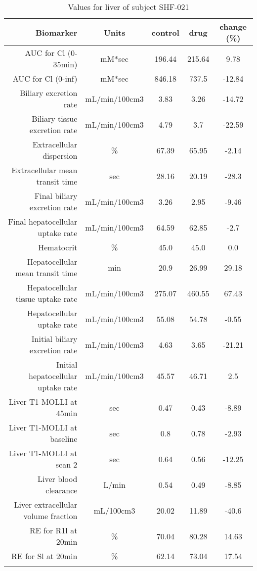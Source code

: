 \documentclass{epflreport}%
\begin{document}
%
\clearpage%
\begin{longtable}{rcccc}%
\hline%
Biomarker&Units&control&drug&change (\%)\\%
\hline%
AUC for Cl (0{-}35min)&mM*sec&196.44&215.64&9.78\\%
AUC for Cl (0{-}inf)&mM*sec&846.18&737.5&{-}12.84\\%
Biliary excretion rate&mL/min/100cm3&3.83&3.26&{-}14.72\\%
Biliary tissue excretion rate&mL/min/100cm3&4.79&3.7&{-}22.59\\%
Extracellular dispersion&\%&67.39&65.95&{-}2.14\\%
Extracellular mean transit time&sec&28.16&20.19&{-}28.3\\%
Final biliary excretion rate&mL/min/100cm3&3.26&2.95&{-}9.46\\%
Final hepatocellular uptake rate&mL/min/100cm3&64.59&62.85&{-}2.7\\%
Hematocrit&\%&45.0&45.0&0.0\\%
Hepatocellular mean transit time&min&20.9&26.99&29.18\\%
Hepatocellular tissue uptake rate&mL/min/100cm3&275.07&460.55&67.43\\%
Hepatocellular uptake rate&mL/min/100cm3&55.08&54.78&{-}0.55\\%
Initial biliary excretion rate&mL/min/100cm3&4.63&3.65&{-}21.21\\%
Initial hepatocellular uptake rate&mL/min/100cm3&45.57&46.71&2.5\\%
Liver T1{-}MOLLI at 45min&sec&0.47&0.43&{-}8.89\\%
Liver T1{-}MOLLI at baseline&sec&0.8&0.78&{-}2.93\\%
Liver T1{-}MOLLI at scan 2&sec&0.64&0.56&{-}12.25\\%
Liver blood clearance&L/min&0.54&0.49&{-}8.85\\%
Liver extracellular volume fraction&mL/100cm3&20.02&11.89&{-}40.6\\%
RE for R1l at 20min&\%&70.04&80.28&14.63\\%
RE for Sl at 20min&\%&62.14&73.04&17.54\\%
\hline%
\caption{Values for liver of subject SHF-021} \\%
\end{longtable}%
\end{document}

